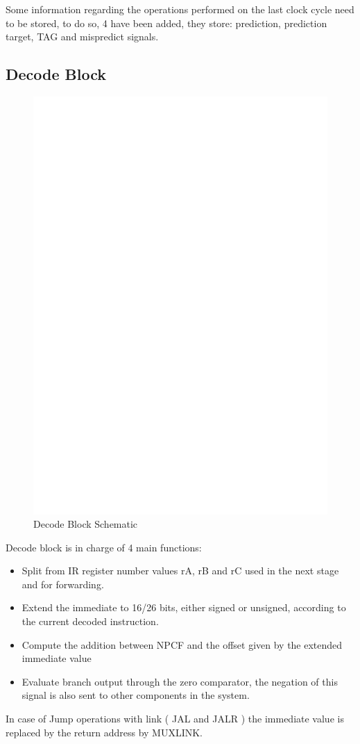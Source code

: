 \documentclass[12pt]{article}
\begin{document}
Some information regarding the operations performed on the last clock cycle need to be stored, to do so, 4 have been added, they store: prediction, prediction target, TAG and mispredict signals.

\subsection{Decode Block}
\begin{figure}[h!]
	\includegraphics[width=\textwidth, center]{images/DECODE_BLOCK.eps}
	\caption{Decode Block Schematic}
	\label{DECODEBLOCK}
\end{figure}
Decode block is in charge of 4 main functions:
\begin{itemize}
	\item Split from IR register number values rA, rB and rC used in the next stage and for forwarding.
	\item Extend the immediate to 16/26 bits, either signed or unsigned, according to the current decoded instruction.
	\item Compute the addition between NPCF and the offset given by the extended immediate value
	\item Evaluate branch output through the zero comparator, the negation of this signal is also sent to other components in the system.
\end{itemize}
In case of Jump operations with link ( JAL and JALR ) the immediate value is replaced by the return address by MUXLINK.
\end{document}
